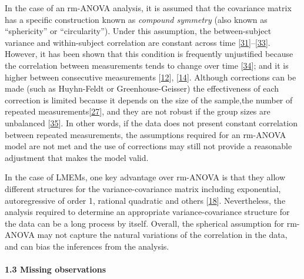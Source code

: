 \documentclass[
]{article}
\begin{document}
In the case of an rm-ANOVA analysis, it is assumed that the covariance
matrix has a specific construction known as \emph{compound symmetry}
(also known as ``sphericity'' or ``circularity''). Under this
assumption, the between-subject variance and within-subject correlation
are constant across time
{[}\protect\hyperlink{ref-weiss2005}{31}{]}--{[}\protect\hyperlink{ref-huynh1976}{33}{]}.
However, it has been shown that this condition is frequently unjustified
because the correlation between measurements tends to change over time
{[}\protect\hyperlink{ref-maxwell2017}{34}{]}; and it is higher between
consecutive measurements
{[}\protect\hyperlink{ref-gueorguieva2004}{12}{]},
{[}\protect\hyperlink{ref-ugrinowitsch2004}{14}{]}. Although corrections
can be made (such as Huyhn-Feldt or Greenhouse-Geisser) the
effectiveness of each correction is limited because it depends on the
size of the sample,the number of repeated
measurements{[}\protect\hyperlink{ref-haverkamp2017}{27}{]}, and they
are not robust if the group sizes are unbalanced
{[}\protect\hyperlink{ref-keselman2001}{35}{]}. In other words, if the
data does not present constant correlation between repeated
measurements, the assumptions required for an rm-ANOVA model are not met
and the use of corrections may still not provide a reasonable adjustment
that makes the model valid.

In the case of LMEMs, one key advantage over rm-ANOVA is that they allow
different structures for the variance-covariance matrix including
exponential, autoregressive of order 1, rational quadratic and others
{[}\protect\hyperlink{ref-pinheiro2006}{18}{]}. Nevertheless, the
analysis required to determine an appropriate variance-covariance
structure for the data can be a long process by itself. Overall, the
spherical assumption for rm-ANOVA may not capture the natural variations
of the correlation in the data, and can bias the inferences from the
analysis.

\hypertarget{missing-observations}{%
\paragraph{1.3 Missing observations}\label{missing-observations}}
\end{document}
